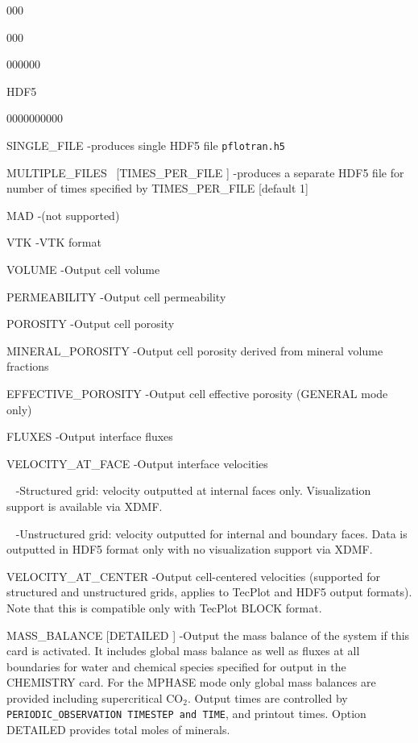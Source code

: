 \begin{deflist}{000}
\begin{deflist}{000}
\begin{deflist}{000000}
\item[HDF5] ~
\begin{deflist}{0000000000}
\item[SINGLE\_FILE] -produces single HDF5 file {\tt pflotran.h5}
\item[MULTIPLE\_FILES \ [TIMES\_PER\_FILE]] -produces a separate HDF5 file for number of times specified by TIMES\_PER\_FILE [default 1]
\end{deflist}

\item[MAD] -(not supported)
\item[VTK] -VTK format
\end{deflist}

\item[VOLUME] -Output cell volume
\item[PERMEABILITY] -Output cell permeability
\item[POROSITY] -Output cell porosity
\item[MINERAL\_POROSITY] -Output cell porosity derived from mineral volume fractions
\item[EFFECTIVE\_POROSITY] -Output cell effective porosity (GENERAL mode only)
\item[FLUXES] -Output interface fluxes
\item[VELOCITY\_AT\_FACE] -Output interface velocities 
\item[~] -Structured grid: velocity outputted at internal faces only. Visualization support is available via XDMF.
\item[~] -Unstructured grid: velocity outputted for internal and boundary faces. Data is outputted in HDF5 format only with no visualization support via XDMF.
\item[VELOCITY\_AT\_CENTER] -Output cell-centered velocities (supported for structured and unstructured grids, applies to TecPlot and HDF5 output formats). Note that this is compatible only with TecPlot BLOCK format.

\item[MASS\_BALANCE [DETAILED]] -Output the mass balance of the system if this card is activated. It includes global mass balance as well as fluxes at all boundaries for water and chemical species specified for output in the CHEMISTRY card. For the MPHASE mode only global mass balances are provided including supercritical CO$_2$. Output times are controlled by {\tt PERIODIC\_OBSERVATION TIMESTEP and TIME}, and printout times. Option DETAILED provides total moles of minerals.
\end{deflist}
\item[\keyend]
\end{deflist}

